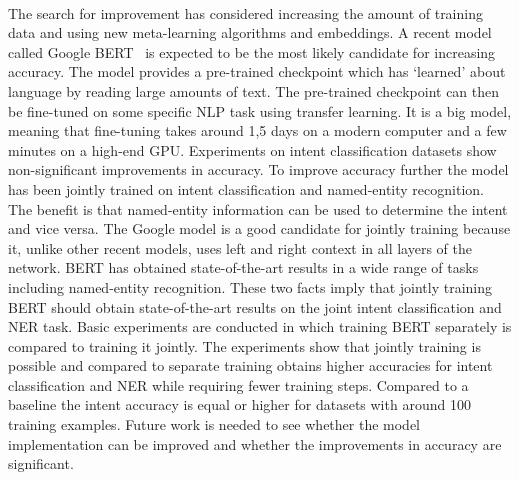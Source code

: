 \rgtwo\\

The search for improvement has considered increasing the amount of training data and using new meta-learning algorithms and embeddings.
A recent model called Google BERT~\citep{devlin2018} is expected to be the most likely candidate for increasing accuracy.
The model provides a pre-trained checkpoint which has `learned' about language by reading large amounts of text.
The pre-trained checkpoint can then be fine-tuned on some specific NLP task using transfer learning.
It is a big model, meaning that fine-tuning takes around 1,5 days on a modern computer and a few minutes on a high-end GPU.
Experiments on intent classification datasets show non-significant improvements in accuracy.
To improve accuracy further the model has been jointly trained on intent classification and named-entity recognition.
The benefit is that named-entity information can be used to determine the intent and vice versa.
The Google model is a good candidate for jointly training because it, unlike other recent models, uses left and right context in all layers of the network.
BERT has obtained state-of-the-art results in a wide range of tasks including named-entity recognition.
These two facts imply that jointly training BERT should obtain state-of-the-art results on the joint intent classification and NER task.
Basic experiments are conducted in which training BERT separately is compared to training it jointly.
The experiments show that jointly training is possible and compared to separate training obtains higher accuracies for intent classification and NER while requiring fewer training steps.
Compared to a baseline the intent accuracy is equal or higher for datasets with around 100 training examples.
Future work is needed to see whether the model implementation can be improved and whether the improvements in accuracy are significant.

\iffalse
In general the NLP field is in an interesting state.
Technology companies have a lot of incentive to push the field forward.
Leaps in the last few years have come from those companies.
For example, FastText by Facebook and transformer models by Google.
A second observation is that state-of-the-art scores are increased every few months.
This results in papers which are quickly pushed to arXiv and cited before any scholarly peer review.
Papers report accuracy high scores with ``few mentions of average cases and variability or worst-cases''~\citep{otter2018survey}.

A recent review paper for deep learning and NLP~\citep{young2018recent} still see lots of potential.
They expect better models for unlabelled data, reinforcement learning, zero-shot learning and network memory enrichment via a knowledge base.

\fi

